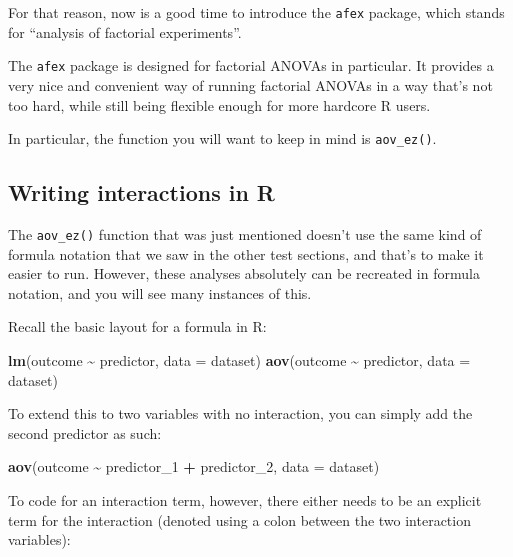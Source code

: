 \documentclass[
]{book}
\newenvironment{Shaded}{\begin{snugshade}}{\end{snugshade}}
\newcommand{\AttributeTok}[1]{\textcolor[rgb]{0.13,0.29,0.53}{#1}}
\newcommand{\FunctionTok}[1]{\textcolor[rgb]{0.13,0.29,0.53}{\textbf{#1}}}
\newcommand{\NormalTok}[1]{#1}
\newcommand{\SpecialCharTok}[1]{\textcolor[rgb]{0.81,0.36,0.00}{\textbf{#1}}}
\begin{document}
For that reason, now is a good time to introduce the \texttt{afex} package, which stands for ``analysis of factorial experiments''.

The \texttt{afex} package is designed for factorial ANOVAs in particular. It provides a very nice and convenient way of running factorial ANOVAs in a way that's not too hard, while still being flexible enough for more hardcore R users.

In particular, the function you will want to keep in mind is \texttt{aov\_ez()}.

\hypertarget{writing-interactions-in-r}{%
\subsection{Writing interactions in R}\label{writing-interactions-in-r}}

The \texttt{aov\_ez()} function that was just mentioned doesn't use the same kind of formula notation that we saw in the other test sections, and that's to make it easier to run. However, these analyses absolutely can be recreated in formula notation, and you will see many instances of this.

Recall the basic layout for a formula in R:

\begin{Shaded}
\begin{Highlighting}[]
\FunctionTok{lm}\NormalTok{(outcome }\SpecialCharTok{\textasciitilde{}}\NormalTok{ predictor, }\AttributeTok{data =}\NormalTok{ dataset)}
\FunctionTok{aov}\NormalTok{(outcome }\SpecialCharTok{\textasciitilde{}}\NormalTok{ predictor, }\AttributeTok{data =}\NormalTok{ dataset)}
\end{Highlighting}
\end{Shaded}

To extend this to two variables with no interaction, you can simply add the second predictor as such:

\begin{Shaded}
\begin{Highlighting}[]
\FunctionTok{aov}\NormalTok{(outcome }\SpecialCharTok{\textasciitilde{}}\NormalTok{ predictor\_1 }\SpecialCharTok{+}\NormalTok{ predictor\_2, }\AttributeTok{data =}\NormalTok{ dataset)}
\end{Highlighting}
\end{Shaded}

To code for an interaction term, however, there either needs to be an explicit term for the interaction (denoted using a colon between the two interaction variables):
\end{document}
